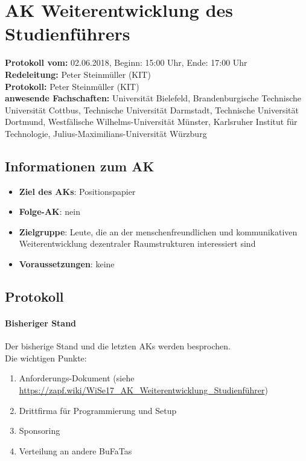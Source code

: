 
\section{AK Weiterentwicklung des Studienführers}

  \textbf{Protokoll vom:} 02.06.2018, %
  Beginn: 15:00 Uhr,
  Ende: 17:00 Uhr \\
  \textbf{Redeleitung:} Peter Steinmüller (KIT) \\
  \textbf{Protokoll:} Peter Steinmüller (KIT) \\
  \textbf{anwesende Fachschaften:} Universität Bielefeld, Brandenburgische Technische Universität Cottbus, Technische Universität Darmstadt, Technische Universität Dortmund, Westfälische Wilhelms-Universität Münster, Karlsruher Institut für Technologie, Julius-Maximilians-Universität Würzburg

  \subsection*{Informationen zum AK}
    \begin{itemize}
      \item \textbf{Ziel des AKs}: Positionspapier
      \item \textbf{Folge-AK}: nein
      \item \textbf{Zielgruppe}: Leute, die an der menschenfreundlichen und kommunikativen Weiterentwicklung dezentraler Raumstrukturen interessiert sind
      \item \textbf{Voraussetzungen}: keine
    \end{itemize}

  \subsection*{Protokoll}
    \paragraph{Bisheriger Stand}
      Der bisherige Stand und die letzten AKs werden besprochen. \\

      Die wichtigen Punkte:
      \begin{enumerate}
        \item Anforderungs-Dokument (siehe \url{https://zapf.wiki/WiSe17_AK_Weiterentwicklung_Studienführer})
        \item Drittfirma für Programmierung und Setup
        \item Sponsoring
        \item Verteilung an andere BuFaTas
      \end{enumerate}

